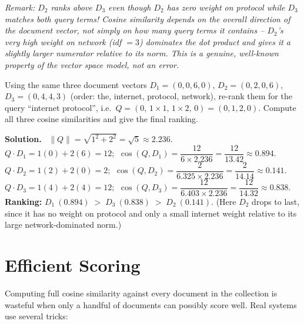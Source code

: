 \documentclass[11pt, a4paper]{article}
\newcommand{\Solution}{\medskip\noindent\textbf{\color{exgreen}Solution.}\ }
\newcommand{\Note}[1]{\par\noindent\textit{\color{darkgray}Remark: #1}\par}
\begin{document}
\Note{$D_2$ ranks \emph{above} $D_3$ even though $D_2$ has \emph{zero} weight on \textsf{protocol} while $D_3$ matches both query terms! Cosine similarity depends on the overall \emph{direction} of the document vector, not simply on how many query terms it contains -- $D_2$'s very high weight on \textsf{network} (idf $=3$) dominates the dot product and gives it a slightly larger numerator relative to its norm. This is a genuine, well-known property of the vector space model, not an error.}

\begin{exercisebox}
Using the same three document vectors $D_1=(0,0,6,0)$, $D_2=(0,2,0,6)$, $D_3=(0,4,4,3)$ (order: the, internet, protocol, network), re-rank them for the query ``\textsf{internet protocol}'', i.e.\ $Q=(0,\,1\times1,\,1\times2,\,0)=(0,1,2,0)$. Compute all three cosine similarities and give the final ranking.
\end{exercisebox}

\Solution
$\lVert Q\rVert=\sqrt{1^2+2^2}=\sqrt5\approx2.236$.\\
$Q\cdot D_1 = 1(0)+2(6)=12$; $\ \cos(Q,D_1)=\dfrac{12}{6\times2.236}=\dfrac{12}{13.42}\approx0.894$.\\
$Q\cdot D_2 = 1(2)+2(0)=2$; $\ \cos(Q,D_2)=\dfrac{2}{6.325\times2.236}=\dfrac{2}{14.14}\approx0.141$.\\
$Q\cdot D_3 = 1(4)+2(4)=12$; $\ \cos(Q,D_3)=\dfrac{12}{6.403\times2.236}=\dfrac{12}{14.32}\approx0.838$.\\
\textbf{Ranking:} $D_1\ (0.894) \;>\; D_3\ (0.838) \;>\; D_2\ (0.141)$. (Here $D_2$ drops to last, since it has no weight on \textsf{protocol} and only a small \textsf{internet} weight relative to its large \textsf{network}-dominated norm.)

\section{Efficient Scoring}
\label{sec:zone-scoring}

Computing full cosine similarity against every document in the collection is wasteful when only a handful of documents can possibly score well. Real systems use several tricks:
\end{document}
